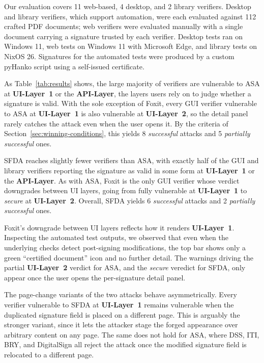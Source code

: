 \documentclass[12pt]{article}
\begin{document}
Our evaluation covers 11 web-based, 4 desktop, and 2 library verifiers. Desktop and library verifiers, which support automation, were each evaluated against 112 crafted PDF documents; web verifiers were evaluated manually with a single document carrying a signature trusted by each verifier. Desktop tests ran on Windows 11, web tests on Windows 11 with Microsoft Edge, and library tests on NixOS 26. Signatures for the automated tests were produced by a custom pyHanko script using a self-issued certificate.

As Table~\ref{tab:results} shows, the large majority of verifiers are vulnerable to ASA at \textbf{UI-Layer~1} or the \textbf{API-Layer}, the layers users rely on to judge whether a signature is valid. With the sole exception of Foxit, every GUI verifier vulnerable to ASA at \textbf{UI-Layer~1} is also vulnerable at \textbf{UI-Layer~2}, so the detail panel rarely catches the attack even when the user opens it. By the criteria of Section~\ref{sec:winning-conditions}, this yields 8 \emph{successful} attacks and 5 \emph{partially successful} ones.

SFDA reaches slightly fewer verifiers than ASA, with exactly half of the GUI and library verifiers reporting the signature as valid in some form at \textbf{UI-Layer~1} or the \textbf{API-Layer}. As with ASA, Foxit is the only GUI verifier whose verdict downgrades between UI layers, going from fully vulnerable at \textbf{UI-Layer~1} to \emph{secure} at \textbf{UI-Layer~2}. Overall, SFDA yields 6 \emph{successful} attacks and 2 \emph{partially successful} ones.

Foxit's downgrade between UI layers reflects how it renders \textbf{UI-Layer~1}. Inspecting the automated test outputs, we observed that even when the underlying checks detect post-signing modifications, the top bar shows only a green ``certified document'' icon and no further detail. The warnings driving the partial \textbf{UI-Layer~2} verdict for ASA, and the \emph{secure} veredict for SFDA, only appear once the user opens the per-signature detail panel.

The page-change variants of the two attacks behave asymmetrically. Every verifier vulnerable to SFDA at \textbf{UI-Layer~1} remains vulnerable when the duplicated signature field is placed on a different page. This is arguably the stronger variant, since it lets the attacker stage the forged appearance over arbitrary content on any page. The same does not hold for ASA, where DSS, ITI, BRY, and DigitalSign all reject the attack once the modified signature field is relocated to a different page.
\end{document}
